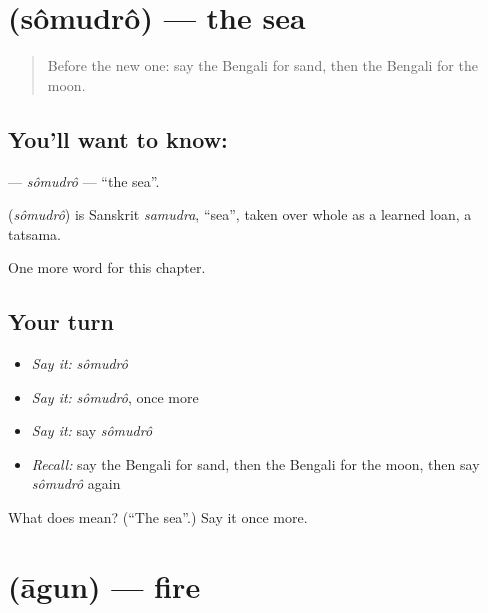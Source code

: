 \section[\texorpdfstring{\bn{সমুদ্র} (sômudrô)}{সমুদ্র (sômudrô)}]{ (sômudrô) — the sea}

\label{lesson:BN-C67-somudro}



\begin{quote}
Before the new one: say the Bengali for sand, then the Bengali for the moon.
\end{quote}

\subsection*{You'll want to know: }
\textbf{} — \emph{sômudrô} — \textquotedblleft{}the sea\textquotedblright{}.

\begin{cousinweb}
\textbf{} (\emph{sômudrô}) is Sanskrit \emph{samudra}, \textquotedblleft{}sea\textquotedblright{}, taken over whole as a learned loan, a tatsama.
\end{cousinweb}

\begin{grammarlens}[title={What you've built}]
One more word for this chapter.
\end{grammarlens}

\subsection*{Your turn}
\begin{itemize}
\raggedright
  \item \emph{Say it:} \emph{sômudrô}
  \item \emph{Say it:} \emph{sômudrô}, once more
  \item \emph{Say it:} say \emph{sômudrô}
  \item \emph{Recall:} say the Bengali for sand, then the Bengali for the moon, then say \emph{sômudrô} again
\end{itemize}

\begin{tcolorbox}[breakable,colback=teal!4,colframe=teal!35!black,title={Before you move on}]
What does  mean? (\textquotedblleft{}The sea\textquotedblright{}.) Say it once more.
\end{tcolorbox}
\section[\texorpdfstring{\bn{আগুন} (āgun)}{আগুন (āgun)}]{ (āgun) — fire}

